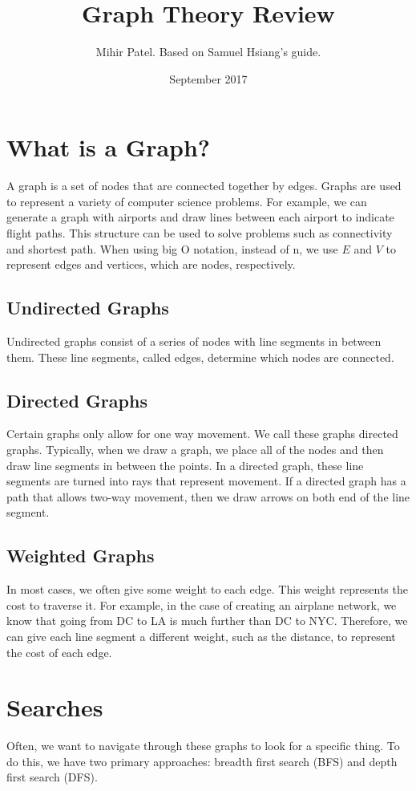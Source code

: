\documentclass{article}
\title{Graph Theory Review}
\author{Mihir Patel. Based on Samuel Hsiang's guide.}
\date{September 2017}
\begin{document}
\maketitle

\section{What is a Graph?}
A graph is a set of nodes that are connected together by edges. Graphs are used to represent a variety of computer science problems. For example, we can generate a graph with airports and draw lines between each airport to indicate flight paths. This structure can be used to solve problems such as connectivity and shortest path. When using big O notation, instead of n, we use $E$ and $V$ to represent edges and vertices, which are nodes, respectively.

\subsection{Undirected Graphs}
Undirected graphs consist of a series of nodes with line segments in between them. These line segments, called edges, determine which nodes are connected.

\subsection{Directed Graphs}
Certain graphs only allow for one way movement. We call these graphs directed graphs. Typically, when we draw a graph, we place all of the nodes and then draw line segments in between the points. In a directed graph, these line segments are turned into rays that represent movement. If a directed graph has a path that allows two-way movement, then we draw arrows on both end of the line segment.

\subsection{Weighted Graphs}
In most cases, we often give some weight to each edge. This weight represents the cost to traverse it. For example, in the case of creating an airplane network, we know that going from DC to LA is much further than DC to NYC. Therefore, we can give each line segment a different weight, such as the distance, to represent the cost of each edge.

\section{Searches}
Often, we want to navigate through these graphs to look for a specific thing. To do this, we have two primary approaches: breadth first search (BFS) and depth first search (DFS).
\end{document}
